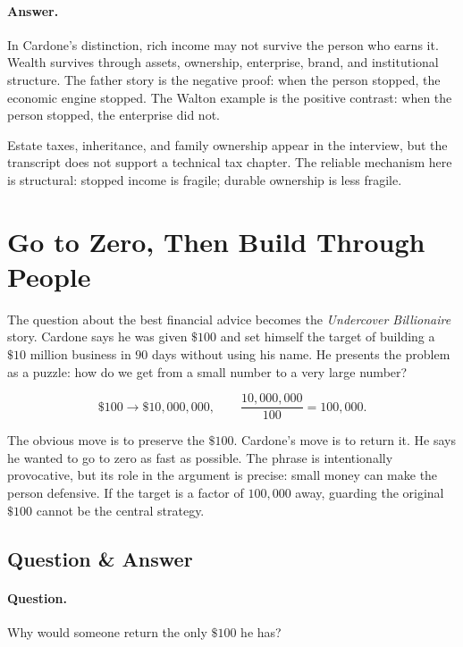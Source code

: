 \paragraph{Answer.} In Cardone's distinction, rich income may not survive the person who earns it. Wealth survives through assets, ownership, enterprise, brand, and institutional structure. The father story is the negative proof: when the person stopped, the economic engine stopped. The Walton example is the positive contrast: when the person stopped, the enterprise did not.

\begin{remark}
Estate taxes, inheritance, and family ownership appear in the interview, but the transcript does not support a technical tax chapter. The reliable mechanism here is structural: stopped income is fragile; durable ownership is less fragile.
\end{remark}

\section{Go to Zero, Then Build Through People}

The question about the best financial advice becomes the \emph{Undercover Billionaire} story. Cardone says he was given \(\$100\) and set himself the target of building a \(\$10\) million business in \(90\) days without using his name. He presents the problem as a puzzle: how do we get from a small number to a very large number?

\begin{equation}
\$100 \longrightarrow \$10{,}000{,}000,
\qquad
\frac{10{,}000{,}000}{100}=100{,}000.
\end{equation}

The obvious move is to preserve the \(\$100\). Cardone's move is to return it. He says he wanted to go to zero as fast as possible. The phrase is intentionally provocative, but its role in the argument is precise: small money can make the person defensive. If the target is a factor of \(100{,}000\) away, guarding the original \(\$100\) cannot be the central strategy.

\subsection{Question \& Answer}

\paragraph{Question.} Why would someone return the only \(\$100\) he has?

